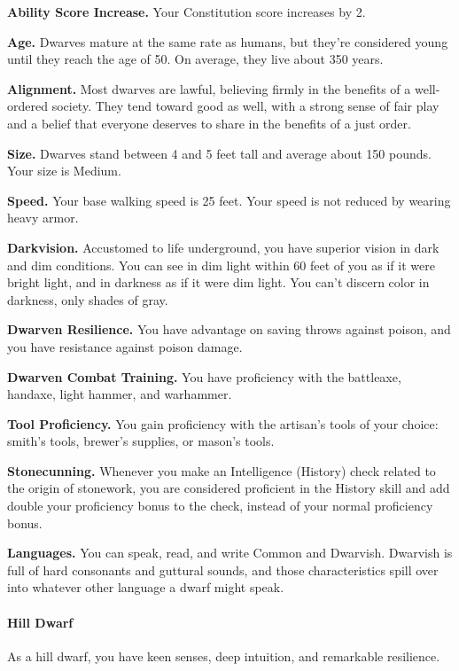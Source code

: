 \textbf{Ability Score Increase.} Your Constitution score increases by 2.

\textbf{Age.} Dwarves mature at the same rate as humans, but they're
considered young until they reach the age of 50. On average, they live
about 350 years.

\textbf{Alignment.} Most dwarves are lawful, believing firmly in the
benefits of a well-ordered society. They tend toward good as well, with
a strong sense of fair play and a belief that everyone deserves to share
in the benefits of a just order.

\textbf{Size.} Dwarves stand between 4 and 5 feet tall and average about
150 pounds. Your size is Medium.

\textbf{Speed.} Your base walking speed is 25 feet. Your speed is not
reduced by wearing heavy armor.

\textbf{Darkvision.} Accustomed to life underground, you have superior
vision in dark and dim conditions. You can see in dim light within 60
feet of you as if it were bright light, and in darkness as if it were
dim light. You can't discern color in darkness, only shades of gray.

\textbf{Dwarven Resilience.} You have advantage on saving throws against
poison, and you have resistance against poison damage.

\textbf{Dwarven Combat Training.} You have proficiency with the
battleaxe, handaxe, light hammer, and warhammer.

\textbf{Tool Proficiency.} You gain proficiency with the artisan's tools
of your choice: smith's tools, brewer's supplies, or mason's tools.

\textbf{Stonecunning.} Whenever you make an Intelligence (History) check
related to the origin of stonework, you are considered proficient in the
History skill and add double your proficiency bonus to the check,
instead of your normal proficiency bonus.

\textbf{Languages.} You can speak, read, and write Common and Dwarvish.
Dwarvish is full of hard consonants and guttural sounds, and those
characteristics spill over into whatever other language a dwarf might
speak.

\hypertarget{hill-dwarf}{%
\paragraph{Hill Dwarf}\label{hill-dwarf}}

As a hill dwarf, you have keen senses, deep intuition, and remarkable
resilience.

